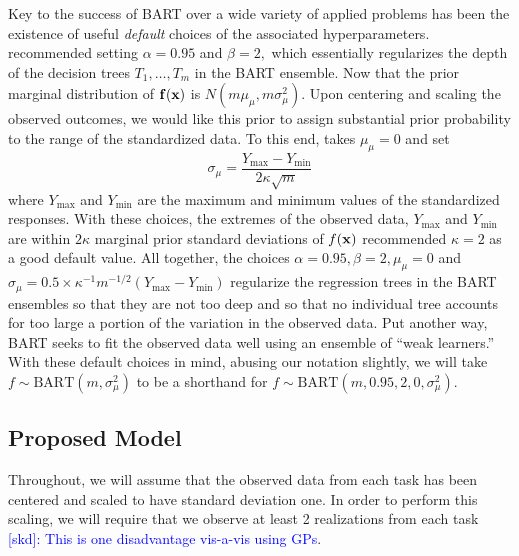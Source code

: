 \documentclass[12pt]{article}
\begin{document}
Key to the success of BART over a wide variety of applied problems has been the existence of useful \textit{default} choices of the associated hyperparameters.
\citet{Chipman2010} recommended setting $\alpha = 0.95$ and $\beta = 2,$ which essentially regularizes the depth of the decision trees $T_{1}, \ldots, T_{m}$ in the BART ensemble.
Now that the prior marginal distribution of $\mathbf{f}(\mathbf{x})$ is $N(m\mu_{\mu}, m\sigma^{2}_{\mu}).$
Upon centering and scaling the observed outcomes, we would like this prior to assign substantial prior probability to the range of the standardized data.
To this end, \citet{Chipman2010} takes $\mu_{\mu} = 0$ and set 
$$
\sigma_{\mu} = \frac{Y_{\max} - Y_{\min}}{2\kappa\sqrt{m}}
$$
where $Y_{\max}$ and $Y_{\min}$ are the maximum and minimum values of the standardized responses.
With these choices, the extremes of the observed data, $Y_{\max}$ and $Y_{\min}$ are within $2\kappa$ marginal prior standard deviations of $f(\mathbf{x})$
\citet{Chipman2010} recommended $\kappa = 2$ as a good default value.
All together, the choices $\alpha = 0.95, \beta = 2, \mu_{\mu} = 0$ and $\sigma_{\mu} = 0.5 \times \kappa^{-1}m^{-1/2}(Y_{\max} - Y_{\min})$ regularize the regression trees in the BART ensembles so that they are not too deep and so that no individual tree accounts for too large a portion of the variation in the observed data. 
Put another way, BART seeks to fit the observed data well using an ensemble of ``weak learners.''
With these default choices in mind, abusing our notation slightly, we will take $f \sim \text{BART}(m, \sigma^{2}_{\mu})$ to be a shorthand for $f \sim \text{BART}(m, 0.95, 2, 0, \sigma^{2}_{\mu}).$


\subsection{Proposed Model}

Throughout, we will assume that the observed data from each task has been centered and scaled to have standard deviation one.
In order to perform this scaling, we will require that we observe at least 2 realizations from each task \textcolor{blue}{[skd]: This is one disadvantage vis-a-vis using GPs}.
\end{document}
